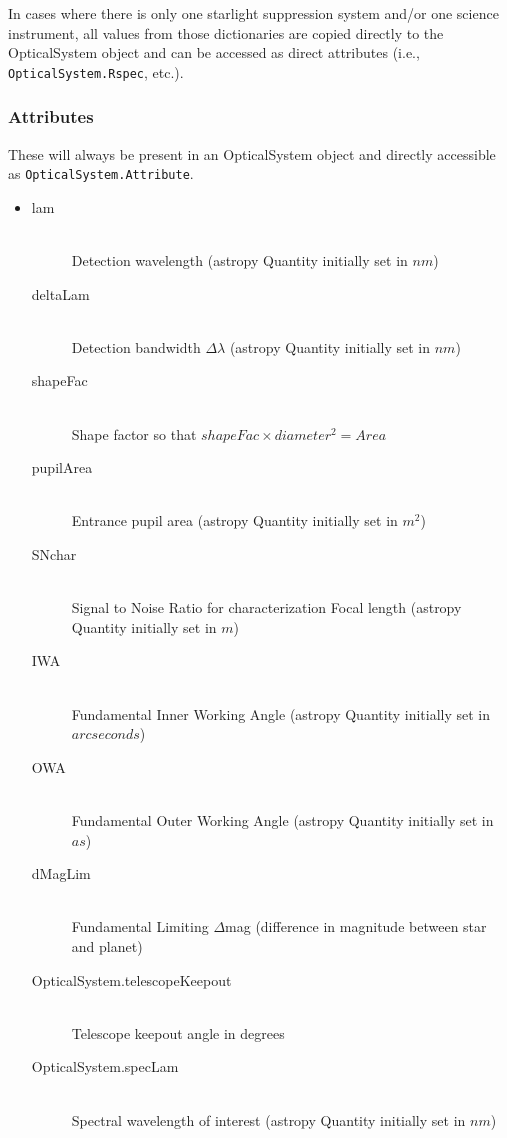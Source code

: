 \documentclass[cleanfoot]{asme2ej}
\begin{document}
In cases where there is only one starlight suppression system and/or one science instrument, all values from those dictionaries are copied directly to the OpticalSystem object and can be accessed as direct attributes (i.e., \verb+OpticalSystem.Rspec+, etc.).

\subsubsection*{Attributes}
These will always be present in an OpticalSystem object and directly accessible as \verb+OpticalSystem.Attribute+.
\begin{itemize}
\item 
\begin{description}
    \item[lam] \hfill \\
    Detection wavelength (astropy Quantity initially set in $ nm $)
    \item[deltaLam] \hfill \\
    Detection bandwidth $ \Delta\lambda $ (astropy Quantity initially set in $ nm $)
    \item[shapeFac] \hfill \\
    Shape factor so that $ shapeFac \times diameter^2 = Area $
    \item[pupilArea] \hfill \\
    Entrance pupil area (astropy Quantity initially set in $ m^{2} $)
    \item[SNchar] \hfill \\
    Signal to Noise Ratio for characterization
    Focal length (astropy Quantity initially set in $ m $)
    \item[IWA] \hfill \\
    Fundamental Inner Working Angle (astropy Quantity initially set in $ arcseconds $)
    \item[OWA] \hfill \\
    Fundamental Outer Working Angle (astropy Quantity initially set in $ as $)
    \item[dMagLim] \hfill \\
    Fundamental Limiting $ \Delta$mag (difference in magnitude between star and planet)
    \item[OpticalSystem.telescopeKeepout] \hfill \\
    Telescope keepout angle in degrees
    \item[OpticalSystem.specLam] \hfill \\
    Spectral wavelength of interest (astropy Quantity initially set in $ nm $)

\end{description}
\end{itemize}
\end{document}
